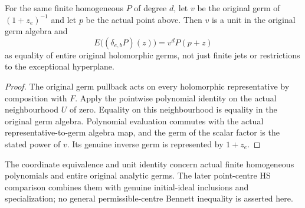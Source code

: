 \begin{theorem}
\label{hir:actual-point-unit-entire-germ-polynomial-dictionary}
\leanok
For the same finite homogeneous $P$ of degree $d$, let $v$ be the
original germ of $(1+z_e)^{-1}$ and let $p$ be the actual point above.
Then $v$ is a unit in the original germ algebra and
\[
 E\bigl((\delta_{e,b}P)(z)\bigr)=v^d P(p+z)
\]
as equality of entire original holomorphic germs, not just finite jets
or restrictions to the exceptional hyperplane.
\end{theorem}
\begin{proof}
The original germ pullback acts on every holomorphic representative
by composition with $F$. Apply the pointwise polynomial identity
on the actual neighbourhood $U$ of zero. Equality on this neighbourhood
is equality in the original germ algebra. Polynomial evaluation commutes
with the actual representative-to-germ algebra map, and the germ of
the scalar factor is the stated power of $v$. Its genuine inverse germ
is represented by $1+z_e$.
\end{proof}

The coordinate equivalence and unit identity concern actual finite
homogeneous polynomials and entire original analytic germs. The later
point-centre HS comparison combines them with genuine initial-ideal
inclusions and specialization; no general permissible-centre Bennett
inequality is asserted here.
